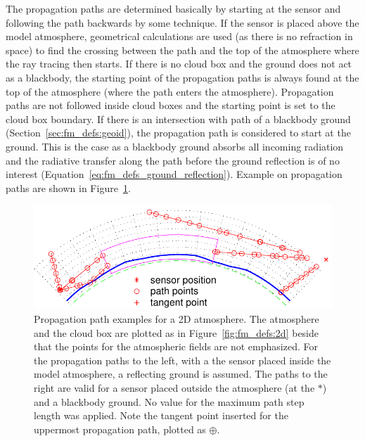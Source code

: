 The propagation paths are determined basically by starting at the
sensor and following the path backwards by some 
technique. If the sensor is placed above the model atmosphere,
geometrical calculations are used (as there is no refraction in space)
to find the crossing between the path and the top of the atmosphere
where the ray tracing then starts. If there is no cloud box and the
ground does not act as a blackbody, the starting point of the propagation
paths is always found at the top of the atmosphere (where the path
enters the atmosphere). Propagation paths are not followed inside
cloud boxes and the starting point is set to the cloud box boundary.
If there is an intersection with path of a blackbody ground
(Section~\ref{sec:fm_defs:geoid}), the propagation path is considered
to start at the ground. This is the case as a blackbody ground absorbs
all incoming radiation and the radiative transfer along the path
before the ground reflection is of no interest
(Equation~\ref{eq:fm_defs_ground_reflection}). Example on propagation
paths are shown in Figure~\ref{fig:fm_defs:ppath_cases1}.

\begin{figure}[!t]
 \begin{center}
  \includegraphics*[width=0.95\hsize]{Figs/fm_definitions/ppath_cases1}
  \caption{Propagation path examples for a 2D atmosphere. The atmosphere 
    and the cloud box are plotted as in Figure~\ref{fig:fm_defs:2d}
    beside that the points for the atmospheric fields are not
    emphasized. For the propagation paths to the left, with a the
    sensor placed inside the model atmosphere, a reflecting ground is
    assumed. The paths to the right are valid for a sensor placed
    outside the atmosphere (at the $*$) and a blackbody ground. No
    value for the maximum path step length was applied. Note the tangent
    point inserted for the uppermost propagation path, plotted as $\oplus$.}
  \label{fig:fm_defs:ppath_cases1}
 \end{center}
\end{figure}
 
